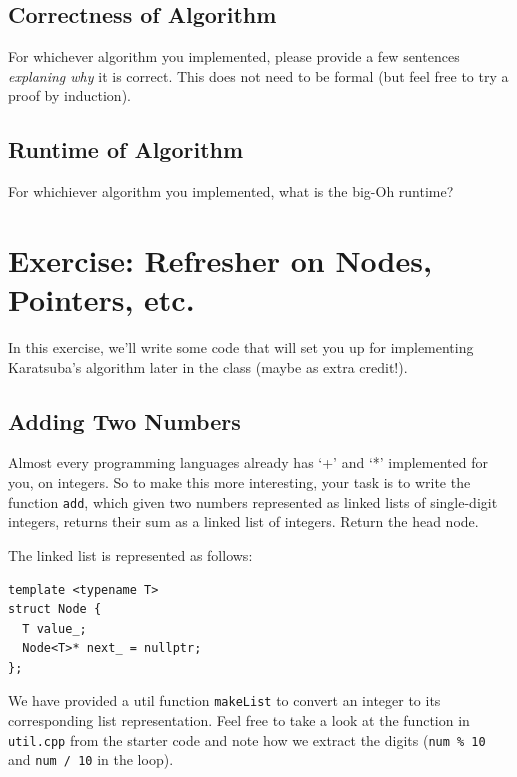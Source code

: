 \documentclass [12pt]{article}
\begin{document}

\subsection{Correctness of Algorithm}
 For whichever algorithm you implemented, please provide a few sentences \textit{explaning why} it is correct. This does not need to be formal (but feel free to try a proof by induction). 


\subsection{Runtime of Algorithm}
 For whichiever algorithm you implemented, what is the big-Oh runtime?


\pagebreak
\section{Exercise: Refresher on Nodes, Pointers, etc.}
 In this exercise, we'll write some code that will set you up for implementing Karatsuba's algorithm later in the class (maybe as extra credit!). 

\subsection{Adding Two Numbers}
Almost every programming languages already has `+' and `*' implemented for you, on integers. So to make this more interesting, your task is to write the function \texttt{add}, which given two numbers represented as linked lists of single-digit
integers, returns their sum as a linked list of integers. Return the head node.

The linked list is represented as follows:
\begin{verbatim}
template <typename T>
struct Node {
  T value_;
  Node<T>* next_ = nullptr;
};
\end{verbatim}

We have provided a util function \texttt{makeList} to convert an integer to its corresponding list representation. Feel free to take a look at the function in \texttt{util.cpp} from the starter code and note how we extract the digits (\texttt{num \% 10} and \texttt{num / 10} in the loop).
\end{document}
